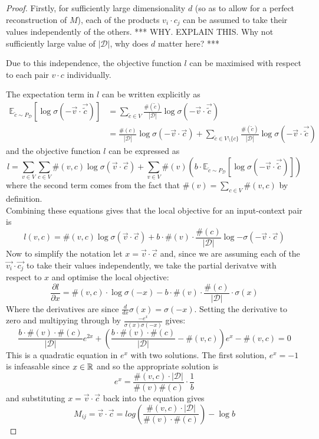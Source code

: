 \documentclass[a4paper]{article}
\renewcommand{\E}{\mathbb E}
\newcommand{\D}{\mathcal D}
\begin{document}
\begin{proof}
  Firstly, for sufficiently large dimensionality $d$ (so as to allow for a perfect
  reconstruction of $M$), each of the products $v_i \cdot c_j$ can be assumed to
  take their values independently of the others.
  *** WHY. EXPLAIN THIS. Why not sufficiently large value of $|\D|$, why does $d$
  matter here? ***

  Due to this independence, the objective function $l$ can be maximised with
  respect to each pair $v \cdot c$ individually.

  The expectation term in $l$ can be written explicitly as
  \begin{align*}
    \E_{\tilde{c} \sim P_{\D}}[\log{\sigma(-\vec{v} \cdot \vec{\tilde{c}})}] &= \sum_{\tilde{c} \in V}{\frac{\#(\tilde{c})}{|\D|} \log{\sigma(-\vec{v} \cdot \vec{\tilde{c}})}}\\
                                                                             &= \frac{\#(c)}{|\D|} \log{\sigma(-\vec{v} \cdot \vec{c})} + \sum_{\tilde{c} \in V \setminus \{c\}}{\frac{\#(\tilde{c})}{|\D|} \log{\sigma(-\vec{v} \cdot \vec{\tilde{c}})}}
  \end{align*}
  and the objective function $l$ can be expressed as
  \begin{equation*}
    l =  \sum_{v \in V}\sum_{c \in V}\#(v, c)\log{\sigma(\vec{v} \cdot \vec{c})} + \sum_{v \in V}\#(v)\left(b \cdot \E_{\tilde{c} \sim P_{\D}}[\log{\sigma(-\vec{v} \cdot \vec{\tilde{c}})}] \right)
  \end{equation*}
  where the second term comes from the fact that $\#(v) = \sum_{c \in V}\#(v,c)$
  by definition.\\
  Combining these equations gives that the local objective for an input-context
  pair is
  \begin{equation}
    l(v, c) = \#(v, c)\log{\sigma(\vec{v} \cdot \vec{c})} + b \cdot \#(v)\cdot \frac{\#(c)}{|\D|}\log{-\sigma(-\vec{v} \cdot \vec{c})} 
  \end{equation}
  Now to simplify the notation let $x = \vec{v} \cdot \vec{c}$ and, since we are
  assuming each of the $\vec{v_i} \cdot \vec{c_j}$ to take their values
  independently, we take the partial derivatve with respect to $x$ and optimise
  the local objective:
  \[\frac{\partial{l}}{\partial{x}} = \#(v, c) \cdot \log{\sigma(-x)} - b \cdot
    \#(v) \cdot \frac{\#(c)}{|\D|} \cdot \sigma(x)\]
  Where the derivatives are since $\frac{d}{dx} \sigma(x) = \sigma(-x)$. Setting
  the derivative to zero and multipying through by
  $\frac{-e^x}{\sigma(x)\sigma(-x)}$ gives:
  \[\frac{b \cdot \#(v) \cdot \#(c)}{|\D|}e^{2x} + \left( \frac{b \cdot \#(v)
        \cdot \#(c)}{|\D|} - \#(v, c) \right)e^x - \#(v, c) = 0\]
  This is a quadratic equation in $e^x$ with two solutions. The first solution,
  $e^x = -1$ is infeasable since $x \in \R$ and so the appropriate solution is
  \[e^x = \frac{\#(v,c) \cdot |\D|}{\#(v)\#(c)} \cdot \frac{1}{b}\]
  and substituting $x = \vec{v} \cdot \vec{c}$ back into the equation gives
  \[M_{ij} = \vec{v} \cdot \vec{c} = log{\left( \frac{\#(v, c) \cdot |\D|}{\#(v) \cdot
          \#(c)} \right)} - \log{b}\]
  
\end{proof}
\end{document}

